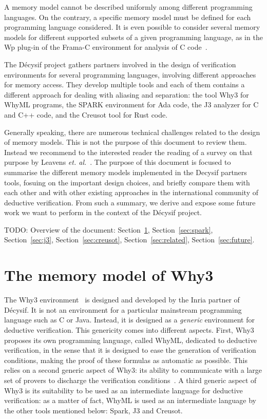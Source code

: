 \documentclass[a4paper,11pt]{article}
\begin{document}
A memory model cannot be described uniformly among different programming
languages. On the contrary, a specific memory model must be defined for each
programming language considered. It is even possible to consider several memory
models for different supported subsets of a given programming language, as in
the Wp plug-in of the Frama-C environment for analysis of C
code~\cite{blanchard2024wp}.

The Décysif project gathers partners involved in the design of
verification environments for several programming languages, involving
different approaches for memory access. They develop multiple tools and each of them
contains a different approach for dealing with aliasing and separation: the tool
Why3 for WhyML programs, the SPARK environment for Ada code, the J3
analyzer for C and C++ code, and the Creusot tool for Rust code.

Generally speaking, there are numerous technical challenges related to the
design of memory models. This is not the purpose of this document to review
them. Instead we recommend to the interested reader the reading of a survey on
that purpose by Leavens \emph{et. al.}~\cite{leavens07}.  The purpose of this
document is focused to summarise the different memory models implemented in the
Decysif partners tools, fosuing on the important design choices, and briefly
compare them with each other and with other existing approaches in the
international community of deductive verification. From such a summary, we
derive and expose some future work we want to perform in the context of the
Décysif project.

TODO: Overview of the document: Section~\ref{sec:why3}, Section~\ref{sec:spark},
Section~\ref{sec:j3}, Section~\ref{sec:creusot}, Section~\ref{sec:related},
Section~\ref{sec:future}.

\section{The memory model of Why3}
\label{sec:why3}

The Why3
environment~\cite{filliatre13esop,bobot14sttt,blazy19fmtea,paskevich20isola} is
designed and developed by the Inria partner of Décysif. It is not an environment
for a particular mainstream programming language such as C or Java. Instead, it
is designed as a \emph{generic} environment for deductive verification. This
genericity comes into different aspects. First, Why3 proposes its own
programming language, called WhyML, dedicated to deductive verification, in the
sense that it is designed to ease the generation of verification conditions,
making the proof of these formulas as automatic as possible. This relies on a
second generic aspect of Why3: its ability to communicate with a large set of
provers to discharge the verification conditions~\cite{boogie11why3}. A third
generic aspect of Why3 is its suitability to be used as an intermediate language
for deductive verification: as a matter of fact, WhyML is used as an
intermediate language by the other tools mentioned below: Spark, J3 and Creusot.
\end{document}
